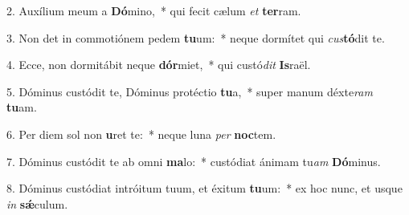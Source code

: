 2. Auxílium meum a \textbf{Dó}mino,~*  qui fecit cælum \textit{et} \textbf{ter}ram.\

3. Non det in commotiónem pedem \textbf{tu}um:~*  neque dormítet qui \textit{cus}\textbf{tó}dit te.\

4. Ecce, non dormitábit neque \textbf{dór}miet,~*  qui custó\textit{dit} \textbf{Is}raël.\

5. Dóminus custódit te, Dóminus protéctio \textbf{tu}a,~*  super manum déxte\textit{ram} \textbf{tu}am.\

6. Per diem sol non \textbf{u}ret te:~*  neque luna \textit{per} \textbf{noc}tem.\

7. Dóminus custódit te ab omni \textbf{ma}lo:~*  custódiat ánimam tu\textit{am} \textbf{Dó}minus.\

8. Dóminus custódiat intróitum tuum, et éxitum \textbf{tu}um:~*  ex hoc nunc, et usque \textit{in} \textbf{sǽ}culum.\

